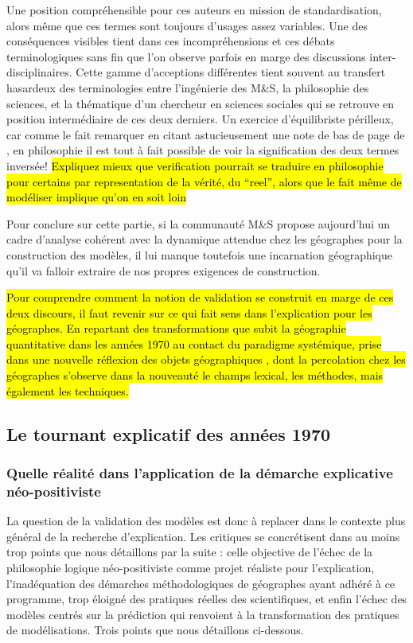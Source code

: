 Une position compréhensible pour ces auteurs en mission de standardisation, alors même que ces termes sont toujours d'usages assez variables. Une des conséquences visibles tient dans ces incompréhensions et ces débats terminologiques sans fin \autocite{David2009} que l'on observe parfois en marge des discussions inter-disciplinaires. Cette gamme d'acceptions différentes tient souvent au transfert hasardeux des terminologies entre l'ingénierie des M\&S, la philosophie des sciences, et la thématique d'un chercheur en sciences sociales qui se retrouve en position intermédiaire de ces deux derniers. Un exercice d'équilibriste périlleux, car comme le fait remarquer \textcite{Kleijnen1995} en citant astucieusement une note de bas de page de \textcite{Barlas1990}, en philosophie il est tout à fait possible de voir la signification des deux termes inversée! \hl{Expliquez mieux que verification pourrait se traduire en philosophie pour certains par representation de la vérité, du “reel”, alors que le fait même de modéliser implique qu’on en soit loin}

Pour conclure sur cette partie, si la communauté M\&S propose aujourd'hui un cadre d'analyse cohérent avec la dynamique attendue chez les géographes pour la construction des modèles, il lui manque toutefois une incarnation géographique qu'il va falloir extraire de nos propres exigences de construction.

\hl{Pour comprendre comment la notion de validation se construit en marge de ces deux discours, il faut revenir sur ce qui fait sens dans l'explication pour les géographes. En repartant des transformations que subit la géographie quantitative dans les années 1970 au contact du paradigme systémique, prise dans une nouvelle réflexion des objets géographiques , dont la percolation chez les géographes s'observe dans la nouveauté le champs lexical, les méthodes, mais également les techniques.}

\subsection{Le tournant explicatif des années 1970} 
\label{ssec:transition_annee70}

\subsubsection{Quelle réalité dans l'application de la démarche explicative néo-positiviste}
\label{sssec:realite_neopositiviste}

La question de la validation des modèles est donc à replacer dans le contexte plus général de la recherche d'explication. Les critiques se concrétisent dans au moins trop points que nous détaillons par la suite : celle objective de l'échec de la philosophie logique néo-positiviste comme projet réaliste pour l'explication, l'inadéquation des démarches méthodologiques de géographes ayant adhéré à ce programme, trop éloigné des pratiques réelles des scientifiques, et enfin l’échec des modèles centrés sur la prédiction qui renvoient à la transformation des pratiques de modélisations. Trois points que nous détaillons ci-dessous.

